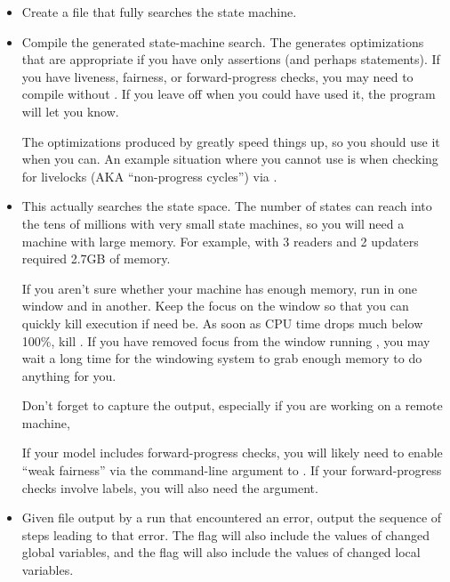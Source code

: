 \begin{itemize}
\item	{}
	Create a file  that fully searches the state machine.
\item	{}
	Compile the generated state-machine search.  The 
	generates optimizations that are appropriate if you have only
	assertions (and perhaps  statements).  If you have
	liveness, fairness, or forward-progress checks, you may need
	to compile without .  If you leave off 
	when you could have used it, the program will let you know.

	The optimizations produced by  greatly speed things
	up, so you should use it when you can.
	An example situation where you cannot use  is
	when checking for livelocks (AKA ``non-progress cycles'')
	via .
\item	{}
	This actually searches the state space.  The number of states
	can reach into the tens of millions with very small state
	machines, so you will need a machine with large memory.
	For example,  with 3 readers and 2 updaters required
	2.7GB of memory.

	If you aren't sure whether your machine has enough memory,
	run  in one window and  in another.  Keep the
	focus on the  window so that you can quickly kill
	execution if need be.  As soon as CPU time drops much below
	100\%, kill .  If you have removed focus from the
	window running , you may wait a long time for the
	windowing system to grab enough memory to do anything for
	you.

	Don't forget to capture the output, especially
	if you are working on a remote machine,

	If your model includes forward-progress checks, you will likely
	need to enable ``weak fairness'' via the  command-line
	argument to .
	If your forward-progress checks involve  labels,
	you will also need the  argument.
\item	{}
	Given  file output by a run that encountered an
	error, output the sequence of steps leading to that error.
	The  flag will also include the values of changed
	global variables, and the   flag will also include
	the values of changed local variables.
\end{itemize}

